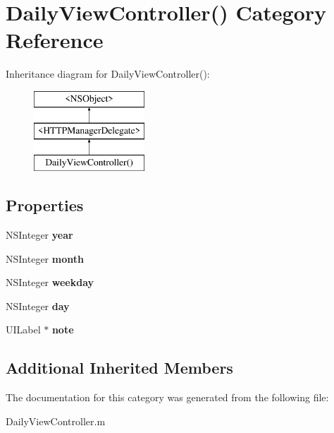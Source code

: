 \hypertarget{category_daily_view_controller_07_08}{\section{Daily\+View\+Controller() Category Reference}
\label{category_daily_view_controller_07_08}
}
Inheritance diagram for Daily\+View\+Controller()\+:\begin{figure}[H]
\begin{center}
\leavevmode
\includegraphics[height=3.000000cm]{category_daily_view_controller_07_08}
\end{center}
\end{figure}
\subsection*{Properties}
\begin{DoxyCompactItemize}
\item 
\hypertarget{category_daily_view_controller_07_08_a4bc351119ecc1922653f30549837eed9}{N\+S\+Integer {\bfseries year}}\label{category_daily_view_controller_07_08_a4bc351119ecc1922653f30549837eed9}

\item 
\hypertarget{category_daily_view_controller_07_08_a5c80677a5d5ff87b5a1a0e1599045672}{N\+S\+Integer {\bfseries month}}\label{category_daily_view_controller_07_08_a5c80677a5d5ff87b5a1a0e1599045672}

\item 
\hypertarget{category_daily_view_controller_07_08_af7c59dac4200affb7e4a30ef33b1e6cb}{N\+S\+Integer {\bfseries weekday}}\label{category_daily_view_controller_07_08_af7c59dac4200affb7e4a30ef33b1e6cb}

\item 
\hypertarget{category_daily_view_controller_07_08_aed7391676fe0644d91739860bd3e9d17}{N\+S\+Integer {\bfseries day}}\label{category_daily_view_controller_07_08_aed7391676fe0644d91739860bd3e9d17}

\item 
\hypertarget{category_daily_view_controller_07_08_aff1c6ff12fd467cd629ff84fad08eb13}{U\+I\+Label $\ast$ {\bfseries note}}\label{category_daily_view_controller_07_08_aff1c6ff12fd467cd629ff84fad08eb13}

\end{DoxyCompactItemize}
\subsection*{Additional Inherited Members}


The documentation for this category was generated from the following file\+:\begin{DoxyCompactItemize}
\item 
Daily\+View\+Controller.\+m\end{DoxyCompactItemize}
